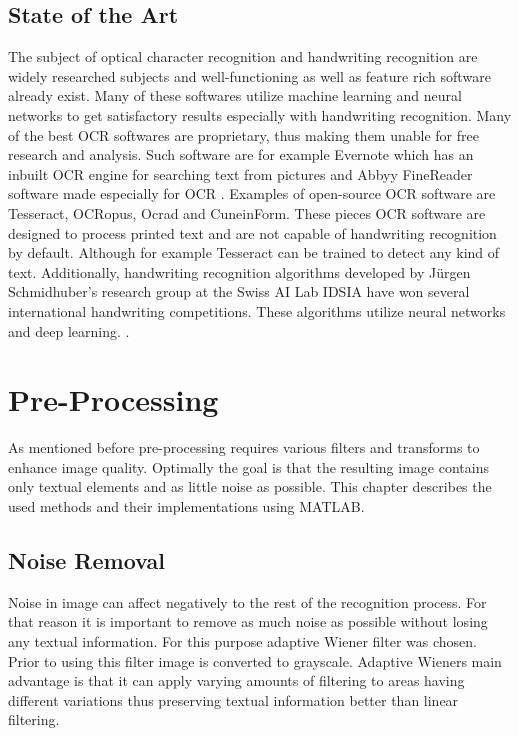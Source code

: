 \documentclass{article}
\begin{document}
    \subsection{State of the Art}
      The subject of optical character recognition and handwriting recognition are widely researched subjects and well-functioning as well as feature rich software already exist. Many of these softwares utilize machine learning and neural networks to get satisfactory results especially with handwriting recognition. Many of the best OCR softwares are proprietary, thus making them unable for free research and analysis. Such software are for example Evernote which has an inbuilt OCR engine for searching text from pictures \cite{Kelly} and Abbyy FineReader software made especially for OCR \cite{ABBYY}. Examples of open-source OCR software are Tesseract\cite{Smith2007a}, OCRopus\cite{Breuel2007}, Ocrad\cite{FreeSoftwareFoundation2016} and CuneinForm\cite{CognitiveTechnologies2016}. These pieces OCR software are designed to process printed text and are not capable of handwriting recognition by default. Although for example Tesseract can be trained to detect any kind of text.\cite{Smith2007a} Additionally, handwriting recognition algorithms developed by Jürgen Schmidhuber's research group at the Swiss AI Lab IDSIA have won several international handwriting competitions. These algorithms utilize neural networks and deep learning. \cite{Angelica}.


  \newpage
  \section{Pre-Processing}
  As mentioned before pre-processing requires various filters and transforms to enhance image quality. Optimally the goal is that the resulting image contains only textual elements and as little noise as possible. This chapter describes the used methods and their implementations using MATLAB.


        \subsection{Noise Removal}
          Noise in image can affect negatively to the rest of the recognition process. For that reason it is important to remove as much noise as possible without losing any textual information. For this purpose adaptive Wiener filter was chosen. Prior to using this filter image is converted to grayscale. Adaptive Wieners main advantage is that it can apply varying amounts of filtering to areas having different variations thus preserving textual information better than linear filtering.\cite{TheMathWorksWiener}
\end{document}
